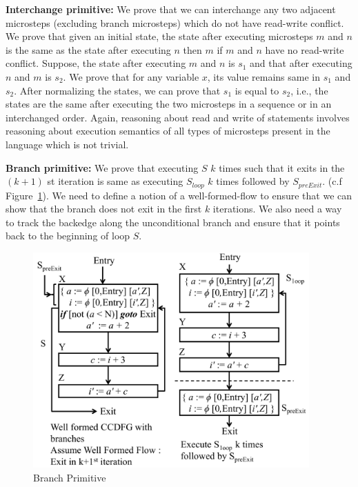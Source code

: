  
  {\bf Interchange primitive:} We prove that we can interchange any two adjacent microsteps
 (excluding branch microsteps) which do not have read-write conflict. We prove that given an initial state, 
 the state after executing microsteps $m$ and $n$ is the same as the state after
  executing $n$ then $m$ if $m$ and $n$ have no read-write
  conflict. Suppose, the state after executing $m$ and $n$ is $s_1$ and 
  that after executing $n$ and $m$ is $s_2$. We prove that for any variable $x$, its
  value remains same in $s_1$ and $s_2$. After normalizing
  the states, we can prove that $s_1$ is equal to $s_2$, i.e.,
  the states are the same after executing the two microsteps in
  a sequence or in an interchanged order. Again, reasoning about read and
  write of statements involves reasoning about execution
  semantics of all types of microsteps present in the
  language which is not trivial.




{\bf Branch primitive:} We prove that executing $S$ $k$ times such that it exits 
in the $(k+1)$ st iteration is same as executing $S_{loop}$ $k$ times followed by $S_{preExit}$. 
(c.f Figure~\ref{fig:primitives3}). We need to define a notion of a well-formed-flow to ensure that we can show that the 
branch does not exit in the first $k$ iterations. We also need a way to track the backedge along the 
unconditional branch and ensure that it points back to the beginning of loop $S$.
  
\begin{figure}[t!]
\begin{center}
\includegraphics[height=3.25in]{fig-proposal/conditional-branch-primitive}
\end{center}
\caption{Branch Primitive}
\label{fig:primitives3}
\end{figure} 
 
